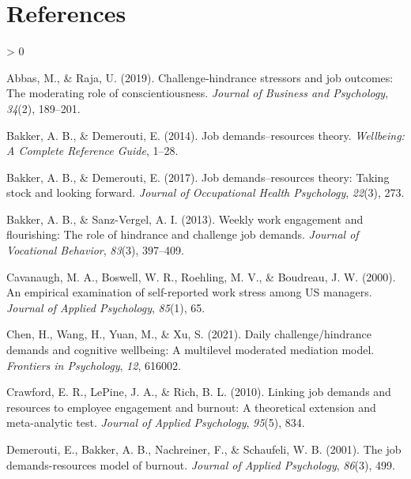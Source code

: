 \documentclass[
  english,
  man]{apa6}
\newlength{\cslhangindent}
\newenvironment{CSLReferences}[2] %
 {%
  \setlength{\parindent}{0pt}
  \ifodd #1 \everypar{\setlength{\hangindent}{\cslhangindent}}\ignorespaces\fi
  \ifnum #2 > 0
  \setlength{\parskip}{#2\baselineskip}
  \fi
 }%
 {}
\begin{document}
\newpage

\hypertarget{references}{%
\section{References}\label{references}}

\begingroup
\setlength{\parindent}{-0.5in}
\setlength{\leftskip}{0.5in}

\hypertarget{refs}{}
\begin{CSLReferences}{1}{0}
\leavevmode\hypertarget{ref-abbas2019challenge}{}%
Abbas, M., \& Raja, U. (2019). Challenge-hindrance stressors and job outcomes: The moderating role of conscientiousness. \emph{Journal of Business and Psychology}, \emph{34}(2), 189--201.

\leavevmode\hypertarget{ref-bakker2014job}{}%
Bakker, A. B., \& Demerouti, E. (2014). Job demands--resources theory. \emph{Wellbeing: A Complete Reference Guide}, 1--28.

\leavevmode\hypertarget{ref-bakker2017job}{}%
Bakker, A. B., \& Demerouti, E. (2017). Job demands--resources theory: Taking stock and looking forward. \emph{Journal of Occupational Health Psychology}, \emph{22}(3), 273.

\leavevmode\hypertarget{ref-bakker2013weekly}{}%
Bakker, A. B., \& Sanz-Vergel, A. I. (2013). Weekly work engagement and flourishing: The role of hindrance and challenge job demands. \emph{Journal of Vocational Behavior}, \emph{83}(3), 397--409.

\leavevmode\hypertarget{ref-cavanaugh2000empirical}{}%
Cavanaugh, M. A., Boswell, W. R., Roehling, M. V., \& Boudreau, J. W. (2000). An empirical examination of self-reported work stress among US managers. \emph{Journal of Applied Psychology}, \emph{85}(1), 65.

\leavevmode\hypertarget{ref-chen2021daily}{}%
Chen, H., Wang, H., Yuan, M., \& Xu, S. (2021). Daily challenge/hindrance demands and cognitive wellbeing: A multilevel moderated mediation model. \emph{Frontiers in Psychology}, \emph{12}, 616002.

\leavevmode\hypertarget{ref-crawford2010linking}{}%
Crawford, E. R., LePine, J. A., \& Rich, B. L. (2010). Linking job demands and resources to employee engagement and burnout: A theoretical extension and meta-analytic test. \emph{Journal of Applied Psychology}, \emph{95}(5), 834.

\leavevmode\hypertarget{ref-demerouti2001job}{}%
Demerouti, E., Bakker, A. B., Nachreiner, F., \& Schaufeli, W. B. (2001). The job demands-resources model of burnout. \emph{Journal of Applied Psychology}, \emph{86}(3), 499.


\end{CSLReferences}
\end{document}
